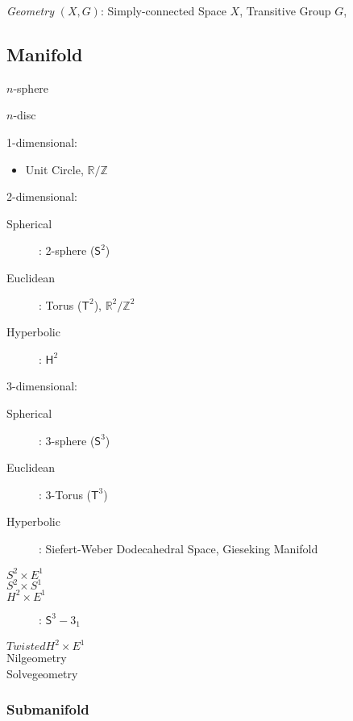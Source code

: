 \emph{Geometry} $(X,G)$: Simply-connected Space $X$, Transitive Group $G$,



\subsection{Manifold}\label{sec:manifold}

$n$-sphere

$n$-disc

1-dimensional:

\begin{itemize}
  \item Unit Circle, $\mathbb{R}/\mathbb{Z}$
\end{itemize}

2-dimensional:

\begin{description}
  \item [Spherical]: 2-sphere ($\mathsf{S}^2$)
  \item [Euclidean]: Torus ($\mathsf{T}^2$),
  $\mathbb{R}^2/\mathbb{Z}^2$
  \item [Hyperbolic]: $\mathsf{H}^2$
\end{description}

3-dimensional:

\begin{description}
  \item [Spherical]: 3-sphere ($\mathsf{S}^3$)
  \item [Euclidean]: 3-Torus ($\mathsf{T}^3$)
  \item [Hyperbolic]: Siefert-Weber Dodecahedral Space, Gieseking
  Manifold
  \item [$S^2 \times E^1$]
  \item [$S^2 \times S^1$]
  \item [$H^2 \times E^1$]: $\mathsf{S}^3 - 3_1$
  \item [$Twisted H^2 \times E^1$]
  \item [Nilgeometry]
  \item [Solvegeometry]
\end{description}



\subsubsection{Submanifold}\label{sec:submanifold}

